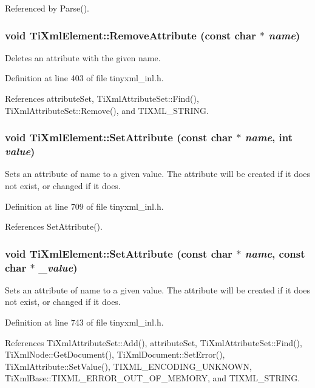 Referenced by Parse().\hypertarget{class_ti_xml_element_a56979767deca794376b1dfa69a525b2a}{
\subsubsection[{RemoveAttribute}]{\setlength{\rightskip}{0pt plus 5cm}void TiXmlElement::RemoveAttribute (const char $\ast$ {\em name})}}
\label{class_ti_xml_element_a56979767deca794376b1dfa69a525b2a}
Deletes an attribute with the given name. 

Definition at line 403 of file tinyxml\_\-inl.h.

References attributeSet, TiXmlAttributeSet::Find(), TiXmlAttributeSet::Remove(), and TIXML\_\-STRING.\hypertarget{class_ti_xml_element_ace6f4be75e373726d4774073d666d1a7}{
\subsubsection[{SetAttribute}]{\setlength{\rightskip}{0pt plus 5cm}void TiXmlElement::SetAttribute (const char $\ast$ {\em name}, \/  int {\em value})}}
\label{class_ti_xml_element_ace6f4be75e373726d4774073d666d1a7}
Sets an attribute of name to a given value. The attribute will be created if it does not exist, or changed if it does. 

Definition at line 709 of file tinyxml\_\-inl.h.

References SetAttribute().\hypertarget{class_ti_xml_element_abf0b3bd7f0e4c746a89ec6e7f101fc32}{
\subsubsection[{SetAttribute}]{\setlength{\rightskip}{0pt plus 5cm}void TiXmlElement::SetAttribute (const char $\ast$ {\em name}, \/  const char $\ast$ {\em \_\-value})}}
\label{class_ti_xml_element_abf0b3bd7f0e4c746a89ec6e7f101fc32}
Sets an attribute of name to a given value. The attribute will be created if it does not exist, or changed if it does. 

Definition at line 743 of file tinyxml\_\-inl.h.

References TiXmlAttributeSet::Add(), attributeSet, TiXmlAttributeSet::Find(), TiXmlNode::GetDocument(), TiXmlDocument::SetError(), TiXmlAttribute::SetValue(), TIXML\_\-ENCODING\_\-UNKNOWN, TiXmlBase::TIXML\_\-ERROR\_\-OUT\_\-OF\_\-MEMORY, and TIXML\_\-STRING.

